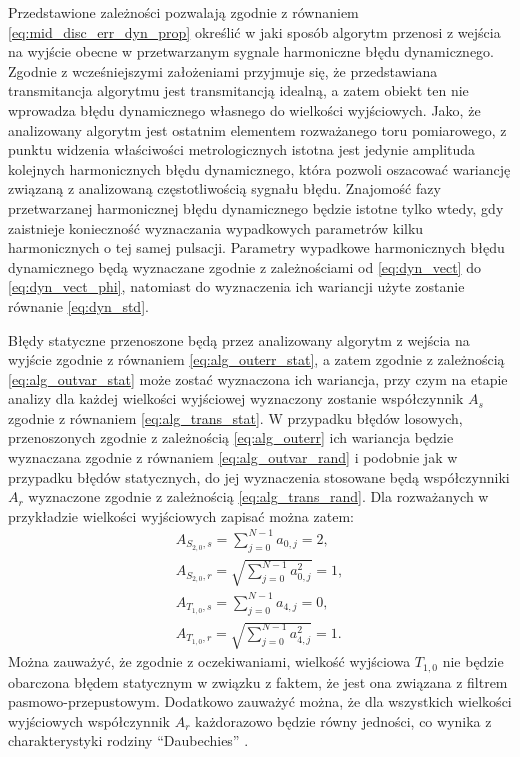 Przedstawione zależności pozwalają zgodnie z równaniem \eqref{eq:mid_disc_err_dyn_prop} określić w jaki sposób algorytm przenosi z wejścia na wyjście obecne w przetwarzanym sygnale harmoniczne błędu dynamicznego. Zgodnie z wcześniejszymi założeniami przyjmuje się, że przedstawiana transmitancja algorytmu jest transmitancją idealną, a zatem obiekt ten nie wprowadza błędu dynamicznego własnego do wielkości wyjściowych. Jako, że analizowany algorytm jest ostatnim elementem rozważanego toru pomiarowego, z punktu widzenia właściwości metrologicznych istotna jest jedynie amplituda kolejnych harmonicznych błędu dynamicznego, która pozwoli oszacować wariancję związaną z analizowaną częstotliwością sygnału błędu. Znajomość fazy przetwarzanej harmonicznej błędu dynamicznego będzie istotne tylko wtedy, gdy zaistnieje konieczność wyznaczania wypadkowych parametrów kilku harmonicznych o tej samej pulsacji. Parametry wypadkowe harmonicznych błędu dynamicznego będą wyznaczane zgodnie z zależnościami od \eqref{eq:dyn_vect} do \eqref{eq:dyn_vect_phi}, natomiast do wyznaczenia ich wariancji użyte zostanie równanie \eqref{eq:dyn_std}.

Błędy statyczne przenoszone będą przez analizowany algorytm z wejścia na wyjście zgodnie z równaniem \eqref{eq:alg_outerr_stat}, a zatem zgodnie z zależnością \eqref{eq:alg_outvar_stat} może zostać wyznaczona ich wariancja, przy czym na etapie analizy dla każdej wielkości wyjściowej wyznaczony zostanie współczynnik $A_{s}$ zgodnie z równaniem \eqref{eq:alg_trans_stat}. W przypadku błędów losowych, przenoszonych zgodnie z zależnością \eqref{eq:alg_outerr} ich wariancja będzie wyznaczana zgodnie z równaniem \eqref{eq:alg_outvar_rand} i podobnie jak w przypadku błędów statycznych, do jej wyznaczenia stosowane będą współczynniki $A_{r}$ wyznaczone zgodnie z zależnością \eqref{eq:alg_trans_rand}. Dla rozważanych w przykładzie wielkości wyjściowych zapisać można zatem:
\begin{gather}
A_{S_{2,0},s} = \sum _{j = 0} ^{N-1} a_{0, j} = 2 \label{eq:sym_partd_output_as_S_2_0}, \\
A_{S_{2,0},r} = \sqrt{\sum _{j = 0} ^{N-1} a_{0, j}^{2}} = 1 \label{eq:sym_partd_output_ar_S_2_0}, \\
A_{T_{1,0},s} = \sum _{j = 0} ^{N-1} a_{4, j} = 0 \label{eq:sym_partd_output_as_T_1_0}, \\
A_{T_{1,0},r} = \sqrt{\sum _{j = 0} ^{N-1} a_{4, j}^{2}} = 1 \label{eq:sym_partd_output_ar_T_1_0}.
\end{gather}
Można zauważyć, że zgodnie z oczekiwaniami, wielkość wyjściowa $T_{1,0}$ nie będzie obarczona błędem statycznym w związku z faktem, że jest ona związana z filtrem pasmowo-przepustowym. Dodatkowo zauważyć można, że dla wszystkich wielkości wyjściowych współczynnik $A_{r}$ każdorazowo będzie równy jedności, co wynika z charakterystyki rodziny \enquote{Daubechies} \cite{vonesch_dbbasics, wei_coiflet}.


